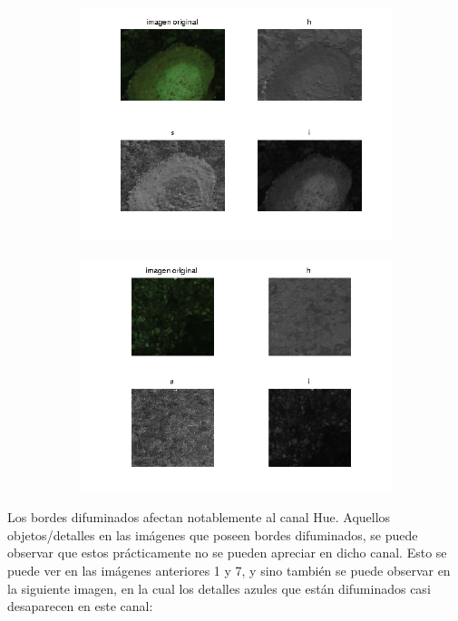\documentclass{article}
\begin{document}
\begin{figure}[H]
	\begin{subfigure}{0.5\textwidth}
	\centering
        \includegraphics[scale=0.6]{im1.png}
    \end{subfigure}\hfill
	\begin{subfigure}{0.5\textwidth}
	\centering
        \includegraphics[scale=0.6]{im2.png}
    \end{subfigure}\hfill
\end{figure}\hfill

Los bordes difuminados afectan notablemente al canal Hue. Aquellos objetos/detalles en las imágenes que poseen bordes difuminados, se puede observar que estos prácticamente no se pueden apreciar en dicho canal. Esto se puede ver en las imágenes anteriores 1 y 7, y sino también se puede observar en la siguiente imagen, en la cual los detalles azules que están difuminados casi desaparecen en este canal: 
\end{document}
